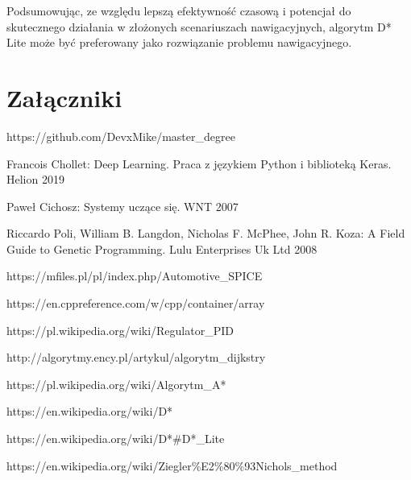 \documentclass[12pt,twoside]{article}
\begin{document}
Podsumowując, ze względu lepszą efektywność czasową i potencjał do skutecznego działania w złożonych scenariuszach nawigacyjnych, algorytm D* Lite może być preferowany jako rozwiązanie problemu nawigacyjnego.


\section*{Załączniki}



\clearpage


\begin{thebibliography}{12}
 https://github.com/DevxMike/master\_degree

 Francois Chollet: Deep Learning. Praca z językiem Python i biblioteką Keras. Helion 2019

 Paweł Cichosz: Systemy uczące się. WNT 2007 

  Riccardo Poli, William B. Langdon, Nicholas F. McPhee, John R. Koza: A Field Guide to Genetic Programming. Lulu Enterprises Uk Ltd 2008

 https://mfiles.pl/pl/index.php/Automotive\_SPICE

 https://en.cppreference.com/w/cpp/container/array

 https://pl.wikipedia.org/wiki/Regulator\_PID

 http://algorytmy.ency.pl/artykul/algorytm\_dijkstry

 https://pl.wikipedia.org/wiki/Algorytm\_A*

 https://en.wikipedia.org/wiki/D*

 https://en.wikipedia.org/wiki/D*\#D*\_Lite

 https://en.wikipedia.org/wiki/Ziegler\%E2\%80\%93Nichols\_method

\end{thebibliography}

\clearpage

\makesummary
\end{document}
